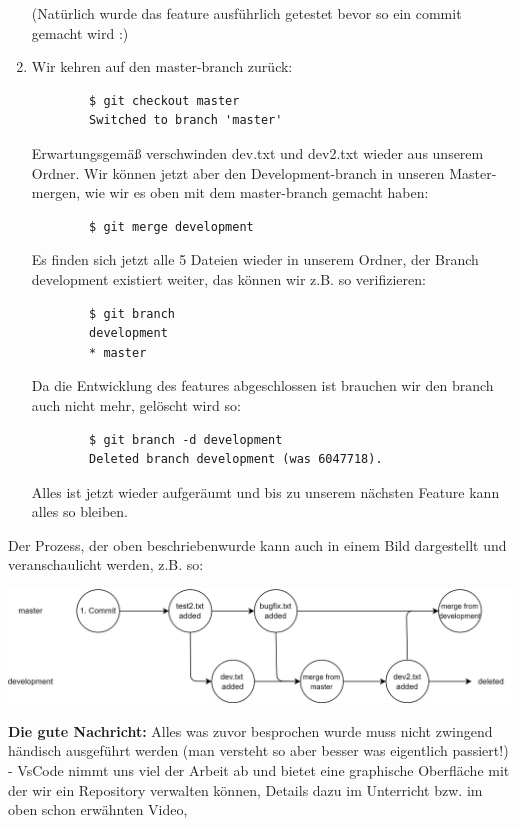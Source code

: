 \documentclass{article}
\begin{document}
\begin{enumerate}
    (Natürlich wurde das feature ausführlich getestet bevor so ein commit gemacht wird :)
    \item Wir kehren auf den master-branch zurück:
    \begin{verbatim}
        $ git checkout master
        Switched to branch 'master'
    \end{verbatim}
    Erwartungsgemäß verschwinden dev.txt und dev2.txt wieder aus unserem Ordner. Wir können jetzt aber den Development-branch in unseren Master-mergen, wie wir es oben mit dem master-branch gemacht haben:
    \begin{verbatim}
        $ git merge development
    \end{verbatim}
    Es finden sich jetzt alle 5 Dateien wieder in unserem Ordner, der Branch development existiert weiter, das können wir z.B. so verifizieren:
    \begin{verbatim}
        $ git branch 
        development 
        * master
    \end{verbatim}
    Da die Entwicklung des features abgeschlossen ist brauchen wir den branch auch nicht mehr, gelöscht wird so:
    \begin{verbatim}
        $ git branch -d development
        Deleted branch development (was 6047718).
    \end{verbatim}
    Alles ist jetzt wieder aufgeräumt und bis zu unserem nächsten Feature kann alles so bleiben.
\end{enumerate}
Der Prozess, der oben beschriebenwurde kann auch in einem Bild dargestellt und veranschaulicht werden, z.B. so: 
\begin{center}
    \includegraphics[scale=0.2]{../../media/git_example.png}
\end{center}

\textbf{Die gute Nachricht:} Alles was zuvor besprochen wurde muss nicht zwingend händisch ausgeführt werden (man versteht so aber besser was eigentlich passiert!) - VsCode nimmt uns viel der Arbeit ab und bietet eine graphische Oberfläche mit der wir ein Repository verwalten können, Details dazu im Unterricht bzw. im oben schon erwähnten Video,
\end{document}
